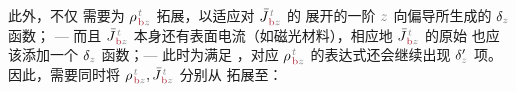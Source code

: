 此外，不仅  需要为 ${\rho}^{\;\!\mathcolor{gray}{t}}_{\;\!\textcolor{Maroon}{\text{b}}\mathcolor{gray}{z}}$ 拓展，以适应对 $\bar{J}^{\;\!\mathcolor{gray}{t}}_{\;\!\textcolor{Maroon}{\text{b}}\mathcolor{gray}{z}}$ 的  展开的一阶 $\mathcolor{gray}{z}$ 向偏导所生成的 $\delta_{\mathcolor{gray}{z}}$ 函数； --- 而且 $\bar{J}^{\;\!\mathcolor{gray}{t}}_{\;\!\textcolor{Maroon}{\text{b}}\mathcolor{gray}{z}}$ 本身还有表面电流（如磁光材料），相应地 $\bar{J}^{\;\!\mathcolor{gray}{t}}_{\;\!\textcolor{Maroon}{\text{b}}\mathcolor{gray}{z}}$ 的原始  也应该添加一个 $\delta_{\mathcolor{gray}{z}}$ 函数；--- 此时为满足 ，对应 ${\rho}^{\;\!\mathcolor{gray}{t}}_{\;\!\textcolor{Maroon}{\text{b}}\mathcolor{gray}{z}}$ 的表达式还会继续出现 $\delta'_{\mathcolor{gray}{z}}$ 项。因此，需要同时将 ${\rho}^{\;\!\mathcolor{gray}{t}}_{\;\!\textcolor{Maroon}{\text{b}}\mathcolor{gray}{z}},\bar{J}^{\;\!\mathcolor{gray}{t}}_{\;\!\textcolor{Maroon}{\text{b}}\mathcolor{gray}{z}}$ 分别从  拓展至：
